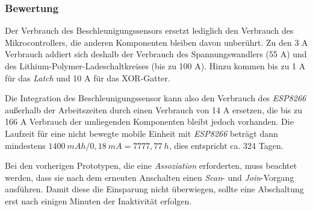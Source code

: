 \subsubsection{Bewertung}
Der Verbrauch des Beschleunigungssensors ersetzt lediglich den Verbrauch des Mikrocontrollers, die anderen Komponenten bleiben davon unberührt.
Zu den 3 \textmu A Verbrauch addiert sich deshalb der Verbrauch des Spannungswandlers (55 \textmu A) und des Lithium-Polymer-Ladeschaltkreises (bis zu 100 \textmu A).
Hinzu kommen bis zu 1 \textmu A für das \emph{Latch} und 10 \textmu A für das XOR-Gatter.

Die Integration des Beschleunigungssensor kann also den Verbrauch des \emph{ESP8266} außerhalb der Arbeitszeiten durch einen Verbrauch von 14 \textmu A ersetzen, die bis zu 166 \textmu A Verbrauch der umliegenden Komponenten bleibt jedoch vorhanden.
Die Laufzeit für eine nicht bewegte mobile Einheit mit \emph{ESP8266} beträgt dann mindestens $1400\ mAh / 0,18\ mA = 7777,77\ h$, dies entspricht ca. 324 Tagen.

Bei den vorherigen Prototypen, die eine \emph{Assoziation} erforderten, muss beachtet werden, dass sie nach dem erneuten Anschalten einen \emph{Scan}- und \emph{Join}-Vorgang ausführen.
Damit diese die Einsparung nicht überwiegen, sollte eine Abschaltung erst nach einigen Minuten der Inaktivität erfolgen.


